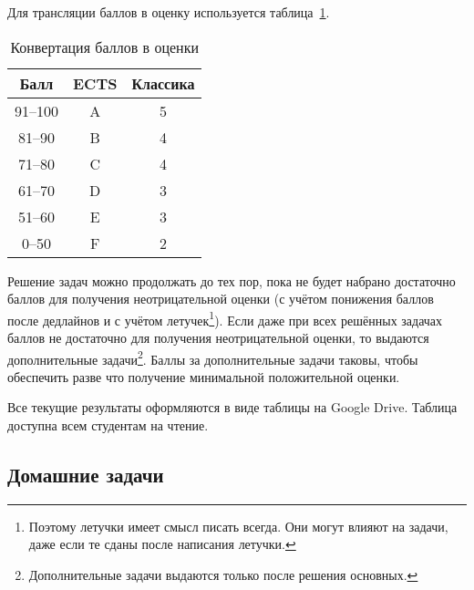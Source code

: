 Для трансляции баллов в оценку используется таблица~\ref{tbl:ects}.

\begin{table}[h]
    \caption{Конвертация баллов в оценки}
    \label{tbl:ects}
\begin{center}
    \begin{tabular}{ | c | c | c |}
        \hline
        Балл & ECTS & Классика \\ 
        \hline
        \hline
        91--100 & A & 5 \\  
        81--90  & B & 4 \\  
        71--80  & C & 4 \\  
        61--70  & D & 3 \\  
        51--60  & E & 3 \\  
         0--50  & F & 2 \\   
        \hline
    \end{tabular}
\end{center}
\end{table}

Решение задач можно продолжать до тех пор, пока не будет набрано достаточно баллов для получения неотрицательной оценки (с учётом понижения баллов после дедлайнов и с учётом летучек\footnote{Поэтому летучки имеет смысл писать всегда. Они могут влияют на задачи, даже если те сданы после написания летучки.}). 
Если даже при всех решённых задачах баллов не достаточно для получения неотрицательной оценки, то выдаются дополнительные задачи\footnote{Дополнительные задачи выдаются только после решения основных.}. 
Баллы за дополнительные задачи таковы, чтобы обеспечить разве что получение минимальной положительной оценки. 

Все текущие результаты оформляются в виде таблицы на Google Drive.
Таблица доступна всем студентам на чтение.

\subsection{Домашние задачи}


